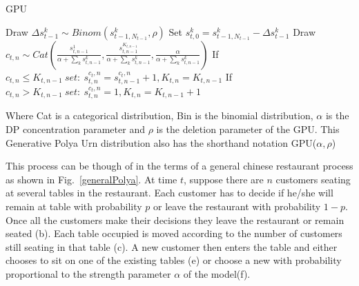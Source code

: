 \documentclass[]{article}
\begin{document}
\begin{algorithm}
    \caption{GPU}\label{GPU}
    \begin{algorithmic}[1]

        \State Draw $\Delta s_{t-1}^k \sim Binom(s_{t-1,N_{t-1}}^k, \rho) $ 
        \State Set $s_{t,0}^{k} = s_{t-1,N_{t-1}}^{k} -\Delta s_{t-1}^k$
        \EndFor
        \State Draw $c_{t,n} \sim Cat( \frac{ s_{t,n-1}^{1} }{\alpha + \sum_k s_{t,n-1}^{k} }, \frac{ s_{t,n-1}^{K_{t,n-1}} }{\alpha + \sum_k s_{t,n-1}^{k} } , \frac{ \alpha}{\alpha + \sum_k s_{t,n-1}^{k} }) $
        \State If $c_{t,n} \leq K_{t,n-1}\ set:\ s_{t,n}^{c_t,n} = s_{t,n-1}^{c_t,n} + 1 , K_{t,n} = K_{t,n-1}$
        \State If $c_{t,n} > K_{t,n-1}\ set:\ s_{t,n}^{c_t,n} = 1 , K_{t,n} = K_{t,n-1} + 1$
        \EndFor
        \EndProcedure
    \end{algorithmic}
\end{algorithm}

Where Cat is a categorical distribution, Bin is the binomial distribution, $\alpha$ is the DP concentration parameter and $\rho$ is the deletion parameter of the GPU. This Generative Polya Urn distribution also has the shorthand notation GPU($\alpha,\rho$)

This process can be though of in the terms of a general chinese restaurant process\cite{antoniak} as shown in Fig.~\ref{generalPolya}. At time $t$, suppose there are $n$ customers seating at several tables in the restaurant. Each customer has to decide if he/she will remain at table with probability $p$ or leave the restaurant with probability $1-p$. Once all the customers make their decisions they leave the restaurant or remain seated (b). Each table occupied is moved according to the number of customers still seating in that table (c). A new customer then enters the table and either chooses to sit on one of the existing tables (e) or choose a new with probability proportional to the strength parameter $\alpha$ of the model(f).
\end{document}
